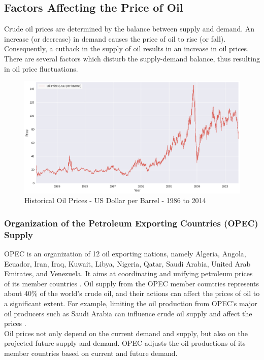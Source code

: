 \documentclass[runningheads]{llncs}
\begin{document}
\subsection{Factors Affecting the Price of Oil}
Crude oil prices are determined by the balance between supply and demand. An increase (or decrease) in demand causes the price of oil to rise (or fall). Consequently, a cutback in the supply of oil results in an increase in oil prices. There are several factors which disturb the supply-demand balance, thus resulting in oil price fluctuations. 


\begin{figure}
\centering
\includegraphics[width=\textwidth]{Oil_since1970.png}
\caption{Historical Oil Prices - US Dollar per Barrel - 1986 to 2014}
\label{fig:Oil_since1970.png}
\end{figure}

\subsubsection{Organization of the Petroleum Exporting Countries (OPEC) Supply}
OPEC is an organization of 12 oil exporting nations, namely Algeria, Angola, Ecuador, Iran, Iraq, Kuwait, Libya, Nigeria, Qatar, Saudi Arabia, United Arab Emirates, and Venezuela. It aims at coordinating and unifying petroleum prices of its member countries \cite{opec}. Oil supply from the OPEC member countries represents about 40\% of the world’s crude oil, and their actions can affect the prices of oil to a significant extent. For example, limiting the oil production from OPEC’s major oil producers such as Saudi Arabia can influence crude oil supply and affect the prices \cite{eiafactors}.\\ 
\noindent Oil prices not only depend on the current demand and supply, but also on the projected future supply and demand. OPEC adjusts the oil productions of its member countries based on current and future demand.
\end{document}
